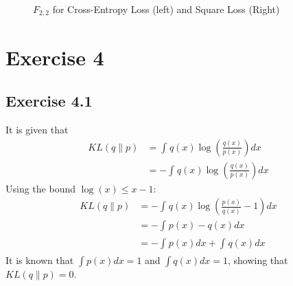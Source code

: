 \documentclass[fleqn]{article}
\begin{document}
\begin{figure}[H]
    \centering
    \qquad
    \caption{$F_{2,2}$ for Cross-Entropy Loss (left) and Square Loss (Right)}
    \label{fig:error_plot_3_v2}
\end{figure}

\section*{Exercise 4}
\subsection*{Exercise 4.1}
It is given that
\begin{equation}
    \begin{split}
        KL(q\|p) & = \int_{}^{} q(x) \log \left( \frac{q(x)}{p(x)} \right) dx \\
        & = - \int_{}^{} q(x) \log \left( \frac{q(x)}{p(x)} \right) dx
    \end{split}
\end{equation}
Using the bound $\log(x) \leqslant x - 1$:
\begin{equation}
    \begin{split}
        KL(q\|p) &= - \int_{}^{} q(x) \log \left(\frac{p(x)}{q(x)} - 1\right) dx \\
        & = - \int_{}^{} p(x) - q(x) dx \\
        & = - \int_{}^{} p(x) dx + \int_{}^{} q(x)dx
    \end{split}
\end{equation}
It is known that $\int p(x) dx = 1$ and $\int q(x) dx = 1$, showing that $KL(q\|p) = 0$.
\end{document}
